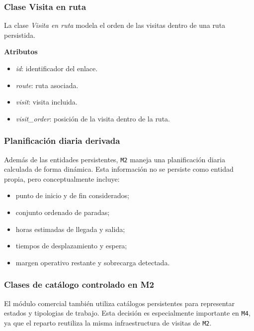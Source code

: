 \subsubsection{Clase Visita en ruta}

La clase \textit{Visita en ruta} modela el orden de las visitas dentro de una ruta persistida.

\textbf{Atributos}

\begin{itemize}
      \item \textit{id}: identificador del enlace.
      \item \textit{route}: ruta asociada.
      \item \textit{visit}: visita incluida.
      \item \textit{visit\_order}: posición de la visita dentro de la ruta.
\end{itemize}

\subsubsection{Planificación diaria derivada}

Además de las entidades persistentes, \texttt{M2} maneja una planificación diaria calculada de forma dinámica. Esta información no se persiste como entidad propia, pero conceptualmente incluye:

\begin{itemize}
      \item punto de inicio y de fin considerados;
      \item conjunto ordenado de paradas;
      \item horas estimadas de llegada y salida;
      \item tiempos de desplazamiento y espera;
      \item margen operativo restante y sobrecarga detectada.
\end{itemize}

\subsubsection{Clases de catálogo controlado en M2}

El módulo comercial también utiliza catálogos persistentes para representar estados y tipologias de trabajo. Esta decisión es especialmente importante en \texttt{M4}, ya que el reparto reutiliza la misma infraestructura de visitas de \texttt{M2}.

